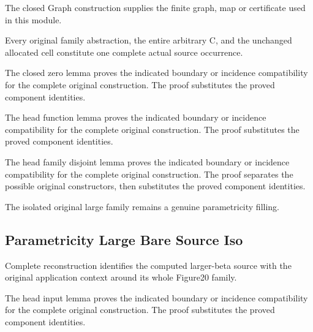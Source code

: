 The closed Graph construction supplies the finite graph, map or certificate used in this module.
\par{}

Every original family abstraction, the entire arbitrary C, and the
unchanged allocated cell constitute one complete actual source occurrence.
\par{}

The closed zero lemma proves the indicated boundary or incidence compatibility for the complete original construction.
The proof substitutes the proved component identities.
\par{}

The head function lemma proves the indicated boundary or incidence compatibility for the complete original construction.
The proof substitutes the proved component identities.
\par{}

The head family disjoint lemma proves the indicated boundary or incidence compatibility for the complete original construction.
The proof separates the possible original constructors, then substitutes the proved component identities.
\par{}

The isolated original large family remains a genuine parametricity filling.
\par{}

\subsection{Parametricity Large Bare Source Iso}
Complete reconstruction identifies the computed larger-beta source
with the original application context around its whole Figure20 family.

The head input lemma proves the indicated boundary or incidence compatibility for the complete original construction.
The proof substitutes the proved component identities.
\par{}

